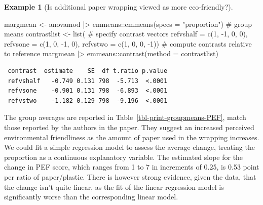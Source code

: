 \documentclass[
  11pt,
  letterpaper,
]{scrbook}
\newenvironment{Shaded}{\begin{snugshade}}{\end{snugshade}}
\newcommand{\AttributeTok}[1]{\textcolor[rgb]{0.40,0.45,0.13}{#1}}
\newcommand{\CommentTok}[1]{\textcolor[rgb]{0.37,0.37,0.37}{#1}}
\newcommand{\DecValTok}[1]{\textcolor[rgb]{0.68,0.00,0.00}{#1}}
\newcommand{\FunctionTok}[1]{\textcolor[rgb]{0.28,0.35,0.67}{#1}}
\newcommand{\NormalTok}[1]{\textcolor[rgb]{0.00,0.23,0.31}{#1}}
\newcommand{\OtherTok}[1]{\textcolor[rgb]{0.00,0.23,0.31}{#1}}
\newcommand{\SpecialCharTok}[1]{\textcolor[rgb]{0.37,0.37,0.37}{#1}}
\newcommand{\StringTok}[1]{\textcolor[rgb]{0.13,0.47,0.30}{#1}}
\theoremstyle{definition}
\theoremstyle{definition}
\newtheorem{example}{Example}[chapter]
\theoremstyle{remark}
\begin{document}
\begin{example}[Is additional paper wrapping viewed as more
eco-friendly?]
\begin{Shaded}
\begin{Highlighting}[]
\NormalTok{margmean }\OtherTok{\textless{}{-}}\NormalTok{ anovamod }\SpecialCharTok{|\textgreater{}}  
\NormalTok{  emmeans}\SpecialCharTok{::}\FunctionTok{emmeans}\NormalTok{(}\AttributeTok{specs =} \StringTok{"proportion"}\NormalTok{) }\CommentTok{\# group means}
\NormalTok{contrastlist }\OtherTok{\textless{}{-}} \FunctionTok{list}\NormalTok{( }\CommentTok{\# specify contrast vectors}
   \AttributeTok{refvshalf =} \FunctionTok{c}\NormalTok{(}\DecValTok{1}\NormalTok{, }\SpecialCharTok{{-}}\DecValTok{1}\NormalTok{, }\DecValTok{0}\NormalTok{, }\DecValTok{0}\NormalTok{),}
   \AttributeTok{refvsone =}  \FunctionTok{c}\NormalTok{(}\DecValTok{1}\NormalTok{, }\DecValTok{0}\NormalTok{, }\SpecialCharTok{{-}}\DecValTok{1}\NormalTok{, }\DecValTok{0}\NormalTok{),}
   \AttributeTok{refvstwo =}  \FunctionTok{c}\NormalTok{(}\DecValTok{1}\NormalTok{, }\DecValTok{0}\NormalTok{, }\DecValTok{0}\NormalTok{, }\SpecialCharTok{{-}}\DecValTok{1}\NormalTok{))}
\CommentTok{\# compute contrasts relative to reference}
\NormalTok{margmean }\SpecialCharTok{|\textgreater{}}\NormalTok{ emmeans}\SpecialCharTok{::}\FunctionTok{contrast}\NormalTok{(}\AttributeTok{method =}\NormalTok{ contrastlist)}
\end{Highlighting}
\end{Shaded}

\begin{verbatim}
 contrast  estimate    SE  df t.ratio p.value
 refvshalf   -0.749 0.131 798  -5.713  <.0001
 refvsone    -0.901 0.131 798  -6.893  <.0001
 refvstwo    -1.182 0.129 798  -9.196  <.0001
\end{verbatim}

The group averages are reported in Table~\ref{tbl-print-groupmeans-PEF},
match those reported by the authors in the paper. They suggest an
increased perceived environmental friendliness as the amount of paper
used in the wrapping increases. We could fit a simple regression model
to assess the average change, treating the proportion as a continuous
explanatory variable. The estimated slope for the change in PEF score,
which ranges from 1 to 7 in increments of 0.25, is 0.53 point per ratio
of paper/plastic. There is however strong evidence, given the data, that
the change isn't quite linear, as the fit of the linear regression model
is significantly worse than the corresponding linear model.

\begin{longtable}[t]{rrrrrr}


\end{longtable}
\end{example}
\end{document}
